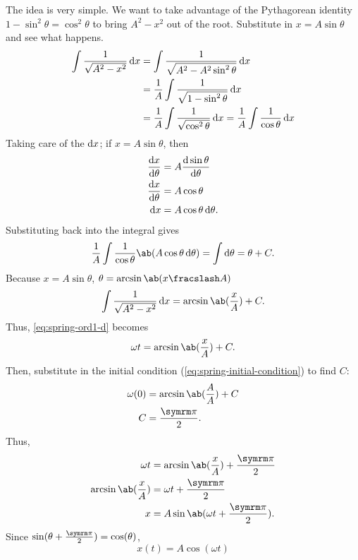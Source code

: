The idea is very simple. We want to take advantage of the Pythagorean identity $1 - \sin^2\theta = \cos^2\theta$ to bring $A^2 - x^2$ out of the root. Substitute in $x = A\sin\theta$ and see what happens.
\begin{align}
	\int\frac{1}{\sqrt{A^2 - x^2}}\odif{x} &= \int\frac{1}{\sqrt{A^2 - A^2\sin^2\theta}}\odif{x} \\
										   &= \frac{1}{A}\int\frac{1}{\sqrt{1 - \sin^2\theta}}\odif{x} \\
										   &= \frac{1}{A}\int\frac{1}{\sqrt{\cos^2\theta}}\odif{x} = \frac{1}{A}\int\frac{1}{\cos\theta}\odif{x}
\end{align}
Taking care of the $\odif{x}$; if $x = A\sin\theta$, then
\begin{align}
	\odv{x}{\theta} &= A\odv{\sin\theta}{\theta} \\
	\odv{x}{\theta} &= A\cos\theta \\
	\odif{x} &= A\cos\theta\odif{\theta}.
\end{align}
Substituting back into the integral gives
\begin{equation}
	\frac{1}{A}\int\frac{1}{\cos\theta}\ab(A\cos\theta\odif{\theta}) = \int\odif{\theta} = \theta + C.
\end{equation}
Because $x = A\sin\theta$, $\theta = \arcsin\ab(\flatfrac{x}{A})$
\begin{equation}
	\int\frac{1}{\sqrt{A^2 - x^2}}\odif{x} = \arcsin\ab(\frac{x}{A}) + C.
\end{equation}
Thus, \cref{eq:spring-ord1-d} becomes
\begin{equation}
	\omega t = \arcsin\ab(\frac{x}{A}) + C.
\end{equation}
Then, substitute in the initial condition (\cref{eq:spring-initial-condition}) to find $C$:
\begin{align}
	\omega(0) &= \arcsin\ab(\frac{A}{A}) + C \\
	C &= \frac{\cpi}{2}.
\end{align}
Thus,
\begin{align}
	\omega t &= \arcsin\ab(\frac{x}{A}) + \frac{\cpi}{2} \\
	\arcsin\ab(\frac{x}{A}) &= \omega t + \frac{\cpi}{2} \\
	x &= A\sin\ab(\omega t + \frac{\cpi}{2}).
\end{align}
Since $\sin(\theta + \frac{\cpi}{2}) = \cos(\theta)$,
\begin{equation}
	x(t) = A\cos(\omega t) \label{eq:harmonic-oscillator-solution}
\end{equation}
